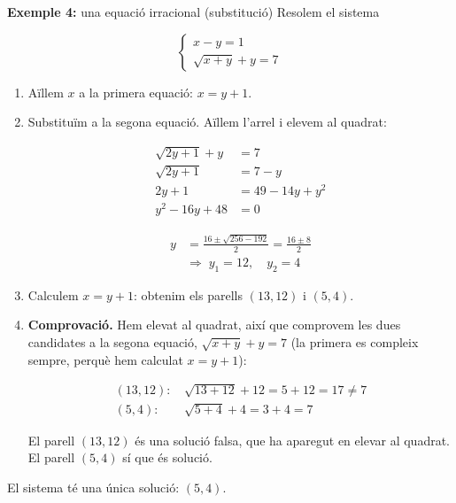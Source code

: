 \begin{exemple}{\textbf{Exemple 4:} una equació irracional (substitució)}
Resolem el sistema

\[
\begin{cases}
x-y=1\\
\sqrt{x+y}+y=7
\end{cases}
\]

\begin{enumerate}
\item Aïllem $x$ a la primera equació: $x=y+1$.
\item Substituïm a la segona equació. Aïllem l'arrel i elevem al quadrat:

\[
\begin{aligned}
\sqrt{2y+1}+y&=7\\
\sqrt{2y+1}&=7-y\\
2y+1&=49-14y+y^2\\
y^2-16y+48&=0
\end{aligned}
\]

\[
\begin{aligned}y&=\frac{16\pm\sqrt{256-192}}{2}=\frac{16\pm 8}{2}\\ &\Rightarrow\; y_1=12,\quad y_2=4\end{aligned}
\]
\item Calculem $x=y+1$: obtenim els parells $(13,12)$ i $(5,4)$.
\item \textbf{Comprovació.} Hem elevat al quadrat, així que comprovem les dues candidates a la segona equació, $\sqrt{x+y}+y=7$ (la primera es compleix sempre, perquè hem calculat $x=y+1$):

\[
\begin{aligned}
(13,12)\text{: }&\sqrt{13+12}+12=5+12=17\neq 7\\
(5,4)\text{: }&\sqrt{5+4}+4=3+4=7
\end{aligned}
\]

El parell $(13,12)$ és una solució falsa, que ha aparegut en elevar al quadrat. El parell $(5,4)$ sí que és solució.
\end{enumerate}

El sistema té una única solució: $(5,4)$.
\end{exemple}

